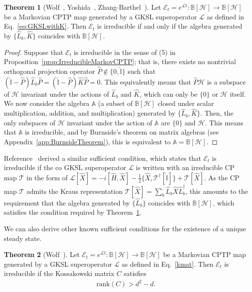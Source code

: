 \documentclass[preprint,pteplogo]{ptephy_v2}%
\numberwithin{equation}{section}
\theoremstyle{definition}
\newtheorem{theorem}{Theorem}
\newcommand{\mc}[1]{\mathcal{#1}}
\newcommand{\mbb}[1]{\mathbb{#1}}
\begin{document}
\begin{theorem}[Wolf~\cite{wolf2012quantum}, Yoshida~\cite{yoshida2024uniqueness}, Zhang-Barthel~\cite{zhang2024criteria}]
\label{thm:YoshidaTheorem}
Let $\mc{E}_t = e^{\mc{L}t} : \mbb{B}[\mc{H}] \to \mbb{B}[\mc{H}]$ be a Markovian CPTP map generated by a GKSL superoperator $\mc{L}$ as defined in Eq.~\eqref{eq:GKSLwithK}.
Then $\mc{E}_t$ is irreducible if and only if the algebra generated by $\{ \hat{L}_b, \hat{K} \}$ coincides with $\mbb{B}[\mc{H}]$.
\end{theorem}

\begin{proof}
Suppose that $\mc{E}_t$ is irreducible in the sense of (5) in Proposition~\ref{prop:IrreducibleMarkovCPTP}; that is, there exists no nontrivial orthogonal projection operator $\hat{P} \notin \{ 0, \hat{\mathbb{I}} \}$ such that $(\hat{\mbb{I}}-\hat{P}) \hat{L}_b \hat{P} = (\hat{\mbb{I}}-\hat{P}) \hat{K} \hat{P} =0$.
This equivalently means that $\hat{P} \mc{H}$ is a subspace of $\mc{H}$ invariant under the actions of $\hat{L}_b$ and $\hat{K}$, which can only be $\{0\} $ or $\mc{H}$ itself.
We now consider the algebra $\mbb{A}$ (a subset of $\mbb{B}[\mc{H}]$ closed under scalar multiplication, addition, and multiplication) generated by $\{ \hat{L}_b, \hat{K} \}$.
Then, the only subspaces of $\mc{H}$ invariant under the action of $\mbb{A}$ are $\{0\}$ and $\mc{H}$.
This means that $\mbb{A}$ is irreducible, and by Burnside's theorem on matrix algebras (see Appendix~\ref{app:BurnsideTheorem}), this is equivalent to $\mbb{A} = \mbb{B}[\mc{H}]$.
\end{proof}

Reference~\cite{jaksic2014entropic} derived a similar sufficient condition, which states that $\mc{E}_t$ is irreducible if the co GKSL superoperator $\mc{L}$ is written with an irreducible CP map $\mc{T}$ in the form of $\mc{L}[\hat{X}] = -i[\hat{H}, \hat{X}] -\frac{1}{2} \{ \hat{X}, \mc{T}^\dagger [\hat{\mbb{I}}] \} +\mc{T}[\hat{X}]$.
As the CP map $\mc{T}$ admits the Kraus representation $\mc{T}[\hat{X}] = \sum_b \hat{L}_b \hat{X} \hat{L}_b^\dagger$, this amounts to the requirement that the algebra generated by $\{ \hat{L}_b \}$ coincides with $\mbb{B}[\mc{H}]$, which satisfies the condition required by Theorem~\ref{thm:YoshidaTheorem}.

We can also derive other known sufficient conditions for the existence of a unique steady state.

\begin{theorem}[Wolf~\cite{wolf2012quantum}]
\label{thm:Kossakowski}
Let $\mc{E}_t = e^{\mc{L}t} : \mbb{B}[\mc{H}] \to \mbb{B}[\mc{H}]$ be a Markovian CPTP map generated by a GKSL superoperator $\mc{L}$ as defined in Eq.~\eqref{kmat}.
Then $\mc{E}_t$ is irreducible if the Kossakowski matrix $C$ satisfies
\begin{align}
\textrm{rank}(C) > d^2-d.
\end{align}
\end{theorem}
\end{document}
